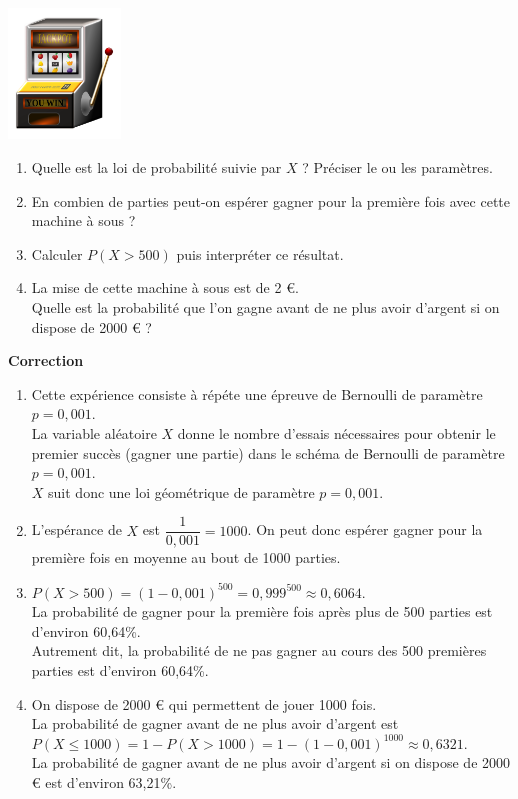 \documentclass[a4paper,11pt,exos]{nsi} %
\begin{document}
{\includegraphics[width=3cm]{casino-161438_1280.png}}
\begin{enumerate}
    \item Quelle est la loi de probabilité suivie par $X$ ? Préciser le ou les paramètres.
    \item En combien de parties peut-on espérer gagner pour la première fois avec cette machine à sous ?
    \item Calculer $P(X>500)$ puis interpréter ce résultat.
    \item La mise de cette machine à sous est de 2 €.\\
    Quelle est la probabilité que l'on gagne avant de ne plus avoir d'argent si on dispose de 2000 € ?
\end{enumerate}

\textcolor{UGLiBlue}{\textbf{Correction}
\begin{enumerate}
    \item Cette expérience consiste à répéte une épreuve de Bernoulli de paramètre $p=0,001$.\\
    La variable aléatoire $X$ donne le nombre d'essais nécessaires pour obtenir le premier succès (gagner une partie) dans le schéma de Bernoulli de paramètre $p=0,001$.\\
    $X$ suit donc une loi géométrique de paramètre $p=0,001$.
    \item L'espérance de $X$ est $\dfrac{1}{0,001}=1000$. On peut donc espérer gagner pour la première fois en moyenne au bout de 1000 parties.
    \item $P(X>500)=(1-0,001)^{500}=0,999^{500}\approx 0,6064$.\\
    La probabilité de gagner pour la première fois après plus de 500 parties est d'environ 60,64\%.\\
    Autrement dit, la probabilité de ne pas gagner au cours des 500 premières parties est d'environ 60,64\%.
    \item On dispose de 2000 € qui permettent de jouer 1000 fois.\\
    La probabilité de gagner avant de ne plus avoir d'argent est $P(X\leqslant 1000)=1-P(X> 1000)=1-(1-0,001)^{1000}\approx 0,6321$.\\
    La probabilité de gagner avant de ne plus avoir d'argent si on dispose de 2000 € est d'environ 63,21\%.
\end{enumerate}}    
\end{document}
